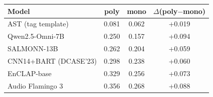 \begin{tabular}{lccc}
\toprule
Model & poly & mono & $\Delta$(poly$-$mono) \\
\midrule
AST (tag template) & 0.081 & 0.062 & +0.019 \\
Qwen2.5-Omni-7B & 0.250 & 0.157 & +0.094 \\
SALMONN-13B & 0.262 & 0.204 & +0.059 \\
CNN14+BART (DCASE'23) & 0.298 & 0.238 & +0.060 \\
EnCLAP-base & 0.329 & 0.256 & +0.073 \\
Audio Flamingo 3 & 0.356 & 0.268 & +0.088 \\
\bottomrule
\end{tabular}
